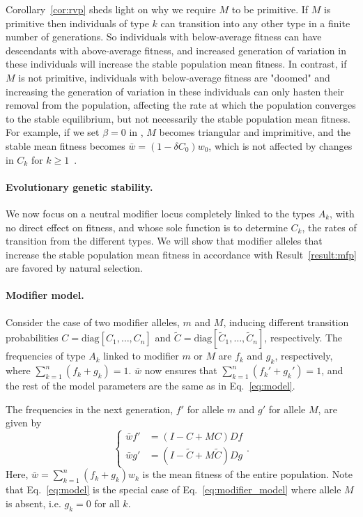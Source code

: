 \documentclass[12pt, twocolumn]{extarticle}
\newcommand{\matrx}[1]{{\left[ \stackrel{}{#1}\right]}}
\newcommand{\diag}[1]{\mbox{diag}\matrx{#1}}
\begin{document}
Corollary~\ref{cor:rvp} sheds light on why we require $M$ to be primitive.
If $M$ is primitive then individuals of type $k$ can transition into any other type in a finite number of generations.
So individuals with below-average fitness can have descendants with above-average fitness, and increased generation of variation in these individuals will increase the stable population mean fitness.
In contrast, if $M$ is not primitive, individuals with below-average fitness are "doomed" and increasing the generation of variation in these individuals can only hasten their removal from the population, affecting the rate at which the population converges to the stable equilibrium, but not necessarily the stable population mean fitness.
For example, if we set $\beta=0$ in , $M$ becomes triangular and imprimitive, and the stable mean fitness becomes $\bar{w} = (1-\delta C_0)w_0$, which is not affected by changes in $C_k$ for $k \ge 1$~\citep[see also][Fig.~1A]{Agrawal2002,Ram2012}.

\paragraph*{Evolutionary genetic stability.}

We now focus on a neutral modifier locus completely linked to the types $A_k$, with no direct effect on fitness, and whose sole function is to determine $C_k$, the rates of transition from the different types.
We will show that modifier alleles that increase the stable population mean fitness in accordance with Result~\ref{result:mfp} are favored by natural selection.

\paragraph*{Modifier model.}
Consider the case of two modifier alleles, $m$ and $M$, inducing different transition probabilities $C=\diag{C_1, \ldots, C_n}$ and $\tilde{C}=\diag{\tilde{C}_1, \ldots, \tilde{C}_n}$, respectively.
The frequencies of type $A_k$ linked to modifier $m$ or $M$ are $f_k$ and $g_k$, respectively, where $\sum_{k=1}^{n}{(f_k + g_k)}=1$.
$\bar{w}$ now ensures that $\sum_{k=1}^{n}{(f_k' + g_k')}=1$, 
and the rest of the model parameters are the same as in Eq.~\ref{eq:model}.

The frequencies in the next generation, $f'$ for allele $m$ and $g'$ for allele $M$, are given by
\begin{equation}
\begin{cases}
\bar{w} f' &= (I-C+MC)D f \\
\bar{w} g' &= (I-\tilde{C}+M\tilde{C})D g
\end{cases}.
\label{eq:modifier_model}
\end{equation}
Here, $\bar{w}=\sum_{k=1}^{n}{(f_k + g_k) w_k}$ is the mean fitness of the entire population. 
Note that Eq.~\ref{eq:model} is the special case of Eq.~\ref{eq:modifier_model} where allele $M$ is absent, i.e. $g_k=0$ for all $k$.
\end{document}
